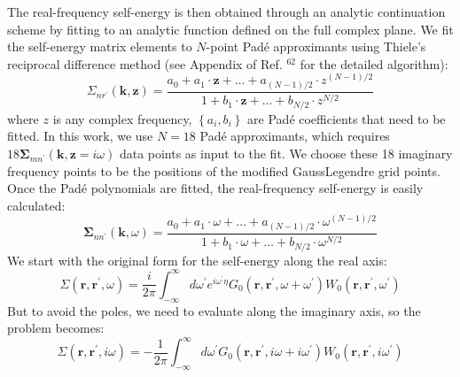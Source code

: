 The real-frequency self-energy is then obtained through an analytic continuation scheme by fitting to an analytic function defined on the full complex plane. We fit the self-energy matrix elements to $N$-point Padé approximants using Thiele's reciprocal difference method (see Appendix of Ref. ${ }^{62}$ for the detailed algorithm):
$$
\Sigma_{n r^{\prime}}(\mathbf{k}, \mathbf{z})=\frac{a_0+a_1 \cdot \mathbf{z}+\ldots+a_{(N-1) / 2} \cdot z^{(N-1) / 2}}{1+b_1 \cdot \mathbf{z}+\ldots+b_{N / 2} \cdot z^{N / 2}}
$$
where $z$ is any complex frequency, $\left\{a_i, b_i\right\}$ are Padé coefficients that need to be fitted. In this work, we use $N=18$ Padé approximants, which requires $18 \mathbf{\Sigma}_{m n^{\prime}}(\mathbf{k}, \mathbf{z}=i \omega)$ data points as input to the fit. We choose these 18 imaginary frequency points to be the positions of the modified GaussLegendre grid points. Once the Padé polynomials are fitted, the real-frequency self-energy is easily calculated:
$$
\mathbf{\Sigma}_{n n^{\prime}}(\mathbf{k}, \omega)=\frac{a_0+a_1 \cdot \omega+\ldots+a_{(N-1) / 2} \cdot \omega^{(N-1) / 2}}{1+b_1 \cdot \omega+\ldots+b_{N / 2} \cdot \omega^{N / 2}}
$$
We start with the original form for the self-energy along the real axis:
\begin{equation}
\Sigma\left(\mathbf{r}, \mathbf{r}^{\prime}, \omega\right)=\frac{i}{2 \pi} \int_{-\infty}^{\infty} d \omega^{\prime} e^{i \omega^{\prime} \eta} G_{0}\left(\mathbf{r}, \mathbf{r}^{\prime}, \omega+\omega^{\prime}\right) W_{0}\left(\mathbf{r}, \mathbf{r}^{\prime}, \omega^{\prime}\right)
\end{equation}
But to avoid the poles, we need to evaluate along the imaginary axis, so the problem becomes:
\begin{equation*}
\Sigma\left(\mathbf{r}, \mathbf{r}^{\prime}, i \omega\right)=-\frac{1}{2 \pi} \int_{-\infty}^{\infty} d \omega^{\prime} G_{0}\left(\mathbf{r}, \mathbf{r}^{\prime}, i \omega+i \omega^{\prime}\right) W_{0}\left(\mathbf{r}, \mathbf{r}^{\prime}, i \omega^{\prime}\right) 
\end{equation*}
